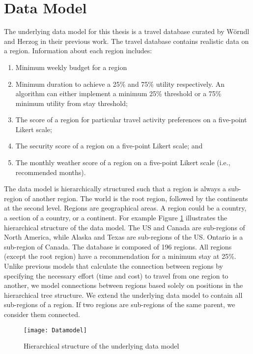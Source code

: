 \section{Data Model}
The underlying data model for this thesis is a travel database curated by Wörndl and Herzog \parencite{cbrecsys2014} in their previous work. The travel database contains realistic data on a region. Information about each region includes:
\begin{enumerate}
    \item Minimum weekly budget for a region
    \item Minimum duration to achieve a 25\% and 75\% utility respectively. An algorithm can either implement a minimum 25\% threshold or a 75\% minimum utility from stay threshold;
    \item The score of a region for particular travel activity preferences on a five-point Likert scale;
    \item The security score of a region on a five-point Likert scale; and
    \item The monthly weather score of a region on a five-point Likert scale (i.e., recommended months).
\end{enumerate}
The data model is hierarchically structured such that a region is always a sub-region of another region. The world is the root region, followed by the continents at the second level. Regions are geographical areas. A region could be a country, a section of a country, or a continent. For example Figure \ref{fig:datamodel} illustrates the hierarchical structure of the data model. The US and Canada are sub-regions of North America, while Alaska and Texas are sub-regions of the US. Ontario is a sub-region of Canada. The database is composed of 196 regions. All regions (except the root region) have a recommendation for a minimum stay at 25\%. Unlike previous models that calculate the connection between regions by specifying the necessary effort (time and cost) to travel from one region to another, we model connections between regions based solely on positions in the hierarchical tree structure. We extend the underlying data model to contain all sub-regions of a region. If two regions are sub-regions of the same parent, we consider them connected.

\begin{figure}
    \centering
    \texttt{[image: Datamodel]}
    \caption{Hierarchical structure of the underlying data model}
    \label{fig:datamodel}
\end{figure}


